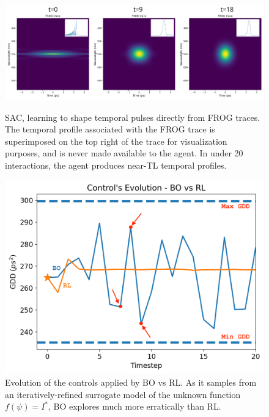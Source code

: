 \begin{figure}
    \centering
    \begin{minipage}{0.65\textwidth}
        \centering
        \includegraphics[width=\linewidth]{images/frogopt.png}
        \caption{SAC, learning to shape temporal pulses directly from FROG traces. The temporal profile associated with the FROG trace is superimposed on the top right of the trace for visualization purposes, and is never made available to the agent. In under 20 interactions, the agent produces near-TL temporal profiles.}
        \label{fig:frog_opt}
    \end{minipage}
    \hfill
    \begin{minipage}{0.30\textwidth}
        \centering
        \includegraphics[width=\linewidth]{images/machinesafety.png}
        \caption{Evolution of the controls applied by BO vs RL. As it samples from an iteratively-refined surrogate model of the unknown function \( f(\psi)=I^*\), BO explores much more erratically than RL.}
        \label{fig:bayes_vs_rl}
    \end{minipage}
\end{figure}

